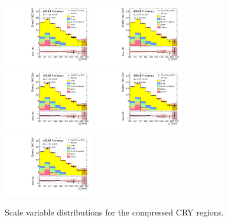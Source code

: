\begin{figure}[tbph]
\begin{center}
\includegraphics[width=0.35\textwidth]{figures/ATLAS-CONF-2016-078_INT/N-1Plots/AtlasStyle/Preliminary/CRY_SRJigsawSRC1_LastCut_CRY_minusone}
\includegraphics[width=0.35\textwidth]{figures/ATLAS-CONF-2016-078_INT/N-1Plots/AtlasStyle/Preliminary/CRY_SRJigsawSRC2_LastCut_CRY_minusone}
\includegraphics[width=0.35\textwidth]{figures/ATLAS-CONF-2016-078_INT/N-1Plots/AtlasStyle/Preliminary/CRY_SRJigsawSRC3_LastCut_CRY_minusone}
\includegraphics[width=0.35\textwidth]{figures/ATLAS-CONF-2016-078_INT/N-1Plots/AtlasStyle/Preliminary/CRY_SRJigsawSRC4_LastCut_CRY_minusone}
\includegraphics[width=0.35\textwidth]{figures/ATLAS-CONF-2016-078_INT/N-1Plots/AtlasStyle/Preliminary/CRY_SRJigsawSRC5_LastCut_CRY_minusone}
\end{center}
\caption{Scale variable distributions for the compressed CRY regions.}
\label{fig:CRY_SRJigsawSRC4_LastCut_CRY_minusone}
\end{figure}

